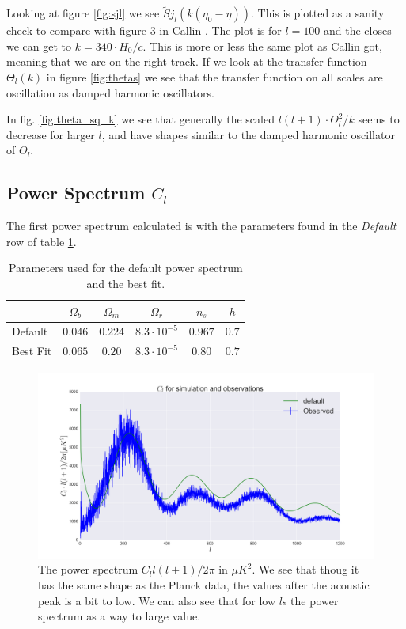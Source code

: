 \documentclass[a4paper,norsk, 10pt]{article}
\begin{document}
Looking at figure \ref{fig:sjl} we see $\tilde{S}j_l(k(\eta_0 - \eta))$. This is plotted as a sanity check to compare with figure 3 in Callin \cite{callin}. The plot is for $l = 100$ and the closes we can get to $k = 340\cdot H_0/c$.  This is more or less the same plot as Callin got, meaning that we are on the right track. If we look at the transfer function $\Theta_l(k)$ in figure \ref{fig:thetas} we see that the transfer function on all scales are oscillation as damped harmonic oscillators. 

In fig. \ref{fig:theta_sq_k} we see that generally the scaled $l(l+1)\cdot \Theta_l^2/k$ seems to decrease for larger $l$, and have shapes similar to the damped harmonic oscillator of $\Theta_l$.

\subsection{Power Spectrum $C_l$}
The first power spectrum calculated is with the parameters found in the \textit{Default} row of table \ref{tab:parameters}. 

\begin{table}[!htb]
\centering
\begin{tabular}{l c c c c c}
& $\Omega_b$ & $\Omega_m$ & $\Omega_r$ & $n_s$ & $h$ \\
\hline 
Default & $0.046$ & $0.224$ & $8.3\cdot 10^{-5}$ & $0.967$ & $0.7$ \\
Best Fit & $0.065$ & $0.20$ & $8.3\cdot 10^{-5}$ & $0.80$ & $0.7$ \\

\end{tabular}
\caption{Parameters used for the default power spectrum and the best fit.}\label{tab:parameters}
\end{table}

\begin{figure}[!htp]
\centering
\includegraphics[scale=0.25]{Cl.png}
\caption{The power spectrum $C_l l(l+1)/2\pi$ in $\mu K^2$. We see that thoug it has the same shape as the Planck data, the values after the acoustic peak is a bit to low. We can also see that for low $l$s the power spectrum as a way to large value.}\label{fig:Cl_default}
\end{figure}
\end{document}
